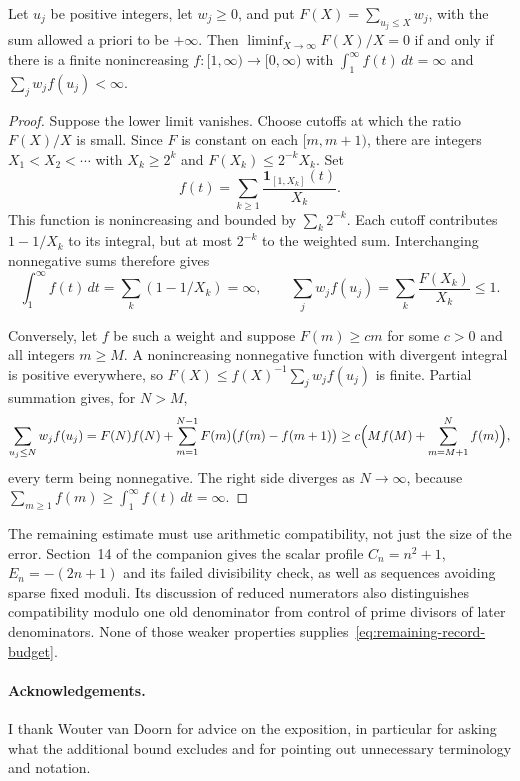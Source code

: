 \documentclass[11pt]{article}
\begin{document}
\begin{lemma}\label{res:weights}
Let $u_j$ be positive integers, let $w_j\ge0$, and put
$F(X)=\sum_{u_j\le X}w_j$, with the sum allowed a priori to be $+\infty$. Then $\liminf_{X\to\infty}F(X)/X=0$ if and only if
there is a finite nonincreasing $f:[1,\infty)\to[0,\infty)$ with
$\int_1^\infty f(t)\,dt=\infty$ and $\sum_jw_jf(u_j)<\infty$.
\end{lemma}

\begin{proof}
Suppose the lower limit vanishes. Choose cutoffs at which the ratio
$F(X)/X$ is small. Since $F$ is constant on each $[m,m+1)$, there are
integers $X_1<X_2<\cdots$ with $X_k\ge2^k$ and
$F(X_k)\le2^{-k}X_k$. Set
\[
 f(t)=\sum_{k\ge1}\frac{\mathbf 1_{[1,X_k]}(t)}{X_k}.
\]
This function is nonincreasing and bounded by $\sum_k2^{-k}$.
Each cutoff contributes $1-1/X_k$ to its integral, but at most $2^{-k}$
to the weighted sum. Interchanging nonnegative sums therefore gives
\[
 \int_1^\infty f(t)\,dt=\sum_k(1-1/X_k)=\infty,
 \qquad
 \sum_jw_jf(u_j)=\sum_k\frac{F(X_k)}{X_k}\le1.
\]

Conversely, let $f$ be such a weight and suppose $F(m)\ge cm$ for some $c>0$
and all integers $m\ge M$. A nonincreasing nonnegative function with divergent
integral is positive everywhere, so $F(X)\le f(X)^{-1}\sum_jw_jf(u_j)$ is
finite. Partial summation gives, for $N>M$,
\[
 \sum_{u_j\le N}w_jf(u_j)
 =F(N)f(N)+\sum_{m=1}^{N-1}F(m)\bigl(f(m)-f(m+1)\bigr)
 \ge c\Bigl(Mf(M)+\sum_{m=M+1}^{N}f(m)\Bigr),
\]
every term being nonnegative. The right side diverges as $N\to\infty$, because
$\sum_{m\ge1}f(m)\ge\int_1^\infty f(t)\,dt=\infty$.
\end{proof}

The remaining estimate must use arithmetic compatibility, not just the
size of the error. Section~14 of the companion gives the scalar profile
$C_n=n^2+1$, $E_n=-(2n+1)$ and its failed divisibility check, as well as
sequences avoiding sparse fixed moduli. Its discussion of reduced
numerators also distinguishes compatibility modulo one old denominator
from control of prime divisors of later denominators. None of those
weaker properties supplies~\eqref{eq:remaining-record-budget}.

\paragraph{Acknowledgements.}
I thank Wouter van Doorn for advice on the exposition, in particular for
asking what the additional bound excludes and for pointing out unnecessary
terminology and notation.
\end{document}
